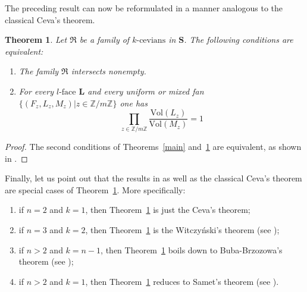 \documentclass[12pt, reqno]{amsart}
\newtheorem{theorem}{Theorem}[section]
\theoremstyle{definition}
\theoremstyle{remark}
\numberwithin{equation}{section}
\begin{document}
{The preceding result can now be reformulated in a manner analogous to the classical Ceva’s theorem.

\begin{theorem} \label{Main!}
Let $\mathfrak{R}$ be a family of $k\mbox{-cevians}$ in $\mathbf{S}$. The following conditions are equivalent:
  \begin{enumerate}
  \item \label{1!} The family $\mathfrak{R}$ intersects nonempty.
  \item \label{2!} For every $l\mbox{-face}$ $\mathbf{L}$ and every uniform or mixed fan $\{(F_z,L_z,M_z)| z\in\mathbb{Z}/m\mathbb{Z}\}$ one has
  $$\prod_{z\in\mathbb{Z}/m\mathbb{Z}} \frac{\mbox{Vol}(L_z)} {\mbox{Vol}(M_z)}=1$$
  \end{enumerate}
\end{theorem}

  
\begin{proof}
The second conditions of Theorems~\ref{main} and~\ref{Main!} are equivalent, as shown in \cite{Samet}.
\end{proof}

Finally, let us point out that the results in \cite{Buba-Brzozowa, Witczynski, Samet} as well as the classical Ceva's theorem are special cases of Theorem~\ref{Main!}. More specifically:
\begin{enumerate}
  \item if $n=2$ and $k=1$, then Theorem~\ref{Main!} is just the Ceva's theorem;
  \item if $n=3$ and $k=2$, then Theorem~\ref{Main!} is the Witczyński's theorem (see \cite[Proposition~2]{Witczynski});  
  \item if $n>2$ and $k=n-1$, then Theorem~\ref{Main!} boils down to Buba-Brzozowa's theorem (see \cite[Theorem~1]{Buba-Brzozowa}); 
  \item if $n>2$ and $k=1$, then Theorem~\ref{Main!} reduces to Samet's theorem (see \cite{Samet}).
\end{enumerate}


}
\end{document}

